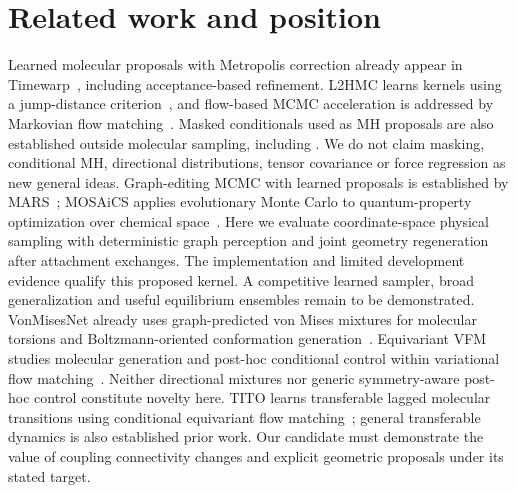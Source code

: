 \section{Related work and position}
\label{sec:related-position}
Learned molecular proposals with Metropolis correction already appear in
Timewarp~\citep{klein2023timewarp}, including acceptance-based refinement.
L2HMC learns kernels using a jump-distance criterion~\citep{levy2018l2hmc},
and flow-based MCMC acceleration is addressed
by Markovian flow matching~\citep{cabezas2024markovian}. Masked conditionals used
as MH proposals are also established outside molecular sampling, including
\citet{goyal2022maskedmh}. We do not claim masking, conditional MH, directional
distributions, tensor covariance or force regression as new general ideas.
Graph-editing MCMC with learned proposals is established by MARS~\citep{xie2021mars};
MOSAiCS applies evolutionary Monte Carlo to quantum-property optimization over
chemical space~\citep{karandashev2023mosaics}. Here we evaluate coordinate-space
physical sampling with deterministic graph perception and joint geometry
regeneration after attachment exchanges. The implementation and limited
development evidence qualify this proposed kernel. A competitive learned sampler,
broad generalization and useful equilibrium ensembles remain to be demonstrated.
VonMisesNet already uses graph-predicted von Mises mixtures for molecular torsions
and Boltzmann-oriented conformation generation~\citep{swanson2023vonmises}.
Equivariant VFM studies molecular generation and post-hoc conditional control
within variational flow matching~\citep{eijkelboom2025controlled}. Neither directional
mixtures nor generic symmetry-aware post-hoc control constitute novelty here.
TITO learns transferable lagged molecular transitions using conditional equivariant
flow matching~\citep{vigueradiez2026tito}; general transferable dynamics is also
established prior work. Our candidate must demonstrate the value of coupling
connectivity changes and explicit geometric proposals under its stated target.
